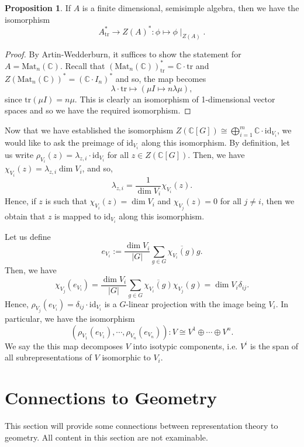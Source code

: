 \documentclass[]{article}
\theoremstyle{definition}
\theoremstyle{definition}
\newtheorem{proposition}{Proposition}[section]
\begin{document}
\begin{proposition}
  If \(A\) is a finite dimensional, semisimple algebra, then we have the isomorphism 
  \[A^*_{\text{tr}} \to Z(A)^* : \phi \mapsto \phi\mid_{Z(A)}.\]
\end{proposition}
\begin{proof}
  By Artin-Wedderburn, it suffices to show the statement for 
  \(A = \text{Mat}_n(\mathbb{C})\). Recall that 
  \((\text{Mat}_n(\mathbb{C}))^*_\text{tr} = \mathbb{C} \cdot \text{tr}\) and 
  \(Z(\text{Mat}_n(\mathbb{C}))^* = (\mathbb{C} \cdot I_n)^*\) and so, 
  the map becomes 
  \[\lambda \cdot \text{tr} \mapsto (\mu I \mapsto n\lambda \mu),\]
  since \(\text{tr}(\mu I) = n\mu\). This is clearly an isomorphism of 
  1-dimensional vector spaces and so we have the required isomorphism.
\end{proof}

Now that we have established the isomorphism 
\(Z(\mathbb{C}[G]) \cong \bigoplus_{i = 1}^m 
\mathbb{C} \cdot \text{id}_{V_i}\), we would like to ask the preimage of 
\(\text{id}_{V_i}\) along this isomorphism. By definition, let us write 
\(\rho_{V_i}(z) = \lambda_{z, i} \cdot \text{id}_{V_i}\) for all 
\(z \in Z(\mathbb{C}[G])\). Then, we have \(\chi_{V_i}(z) = \lambda_{z, i} \dim V_i\), 
and so, 
\[\lambda_{z, i} = \frac{1}{\dim V_i} \chi_{V_i}(z).\]
Hence, if \(z\) is such that \(\chi_{V_i}(z) = \dim V_i\) and \(\chi_{V_j}(z) = 0\) 
for all \(j \neq i\), then we obtain that \(z\) is mapped to \(\text{id}_{V_i}\) 
along this isomorphism. 

Let us define 
\[e_{V_i} := \frac{\dim V_i}{|G|} \sum_{g \in G} \overline{\chi_{V_i}(g)}g.\]
Then, we have 
\[\chi_{V_j}(e_{V_i}) = \frac{\dim V_i}{|G|} \sum_{g \in G} 
  \overline{\chi_{V_i}(g)}\chi_{V_j}(g) = \dim V_i \delta_{ij}.\]
Hence, \(\rho_{V_j}(e_{V_i}) = \delta_{ij} \cdot \text{id}_{V_i}\) is a 
\(G\)-linear projection with the image being \(V_i\). In particular, 
we have the isomorphism
\[(\rho_{V_1}(e_{V_1}), \cdots, \rho_{V_n}(e_{V_n})) : 
  V \cong V^1 \oplus \cdots \oplus V^n.\]
We say the this map decomposes \(V\) into isotypic components, i.e. 
\(V^i\) is the span of all subrepresentations of \(V\) isomorphic to 
\(V_i\).

\newpage
\section{Connections to Geometry}

This section will provide some connections between representation theory to 
geometry. All content in this section are not examinable.
\end{document}
